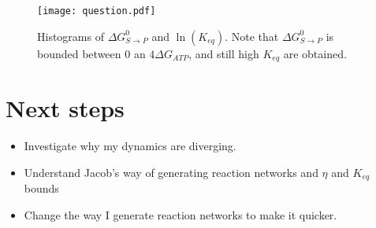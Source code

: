 \documentclass[10pt,letterpaper]{article}
\begin{document}
		\begin{figure}[h]
		    \centering
		    \texttt{[image: question.pdf]}
		    \caption{Histograms of $ \Delta G^{0}_{S\rightarrow P} $ and $ \ln(K_{eq}) $. Note that $ \Delta G^{0}_{S\rightarrow P} $ is bounded between 0 an $  4\Delta G_{ATP} $, and still high $ K_{eq} $ are obtained. }
		\end{figure}
	
	\section*{Next steps}
		\begin{itemize}
			\item Investigate why my dynamics are diverging.
			\item Understand Jacob's way of generating reaction networks and $ \eta $ and $ K_{eq} $ bounds
			\item 	Change the way I generate reaction networks to make it quicker.
		\end{itemize}
	
		
		
\end{document}
